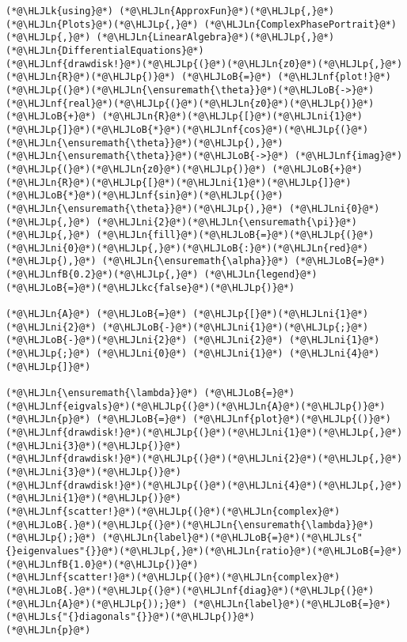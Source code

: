 \documentclass[12pt,a4paper]{article}
\newcommand{\HLJLk}[1]{\textcolor[RGB]{148,91,176}{\textbf{#1}}}
\newcommand{\HLJLkc}[1]{\textcolor[RGB]{59,151,46}{\textit{#1}}}
\newcommand{\HLJLn}[1]{#1}
\newcommand{\HLJLnf}[1]{\textcolor[RGB]{66,102,213}{#1}}
\newcommand{\HLJLs}[1]{\textcolor[RGB]{201,61,57}{#1}}
\newcommand{\HLJLnfB}[1]{\textcolor[RGB]{59,151,46}{#1}}
\newcommand{\HLJLni}[1]{\textcolor[RGB]{59,151,46}{#1}}
\newcommand{\HLJLoB}[1]{\textcolor[RGB]{102,102,102}{\textbf{#1}}}
\newcommand{\HLJLp}[1]{#1}
\begin{document}
\begin{lstlisting}
(*@\HLJLk{using}@*) (*@\HLJLn{ApproxFun}@*)(*@\HLJLp{,}@*) (*@\HLJLn{Plots}@*)(*@\HLJLp{,}@*) (*@\HLJLn{ComplexPhasePortrait}@*)(*@\HLJLp{,}@*) (*@\HLJLn{LinearAlgebra}@*)(*@\HLJLp{,}@*) (*@\HLJLn{DifferentialEquations}@*)
(*@\HLJLnf{drawdisk!}@*)(*@\HLJLp{(}@*)(*@\HLJLn{z0}@*)(*@\HLJLp{,}@*) (*@\HLJLn{R}@*)(*@\HLJLp{)}@*) (*@\HLJLoB{=}@*) (*@\HLJLnf{plot!}@*)(*@\HLJLp{(}@*)(*@\HLJLn{\ensuremath{\theta}}@*)(*@\HLJLoB{->}@*) (*@\HLJLnf{real}@*)(*@\HLJLp{(}@*)(*@\HLJLn{z0}@*)(*@\HLJLp{)}@*) (*@\HLJLoB{+}@*) (*@\HLJLn{R}@*)(*@\HLJLp{[}@*)(*@\HLJLni{1}@*)(*@\HLJLp{]}@*)(*@\HLJLoB{*}@*)(*@\HLJLnf{cos}@*)(*@\HLJLp{(}@*)(*@\HLJLn{\ensuremath{\theta}}@*)(*@\HLJLp{),}@*) (*@\HLJLn{\ensuremath{\theta}}@*)(*@\HLJLoB{->}@*) (*@\HLJLnf{imag}@*)(*@\HLJLp{(}@*)(*@\HLJLn{z0}@*)(*@\HLJLp{)}@*) (*@\HLJLoB{+}@*) (*@\HLJLn{R}@*)(*@\HLJLp{[}@*)(*@\HLJLni{1}@*)(*@\HLJLp{]}@*)(*@\HLJLoB{*}@*)(*@\HLJLnf{sin}@*)(*@\HLJLp{(}@*)(*@\HLJLn{\ensuremath{\theta}}@*)(*@\HLJLp{),}@*) (*@\HLJLni{0}@*)(*@\HLJLp{,}@*) (*@\HLJLni{2}@*)(*@\HLJLn{\ensuremath{\pi}}@*)(*@\HLJLp{,}@*) (*@\HLJLn{fill}@*)(*@\HLJLoB{=}@*)(*@\HLJLp{(}@*)(*@\HLJLni{0}@*)(*@\HLJLp{,}@*)(*@\HLJLoB{:}@*)(*@\HLJLn{red}@*)(*@\HLJLp{),}@*) (*@\HLJLn{\ensuremath{\alpha}}@*) (*@\HLJLoB{=}@*) (*@\HLJLnfB{0.2}@*)(*@\HLJLp{,}@*) (*@\HLJLn{legend}@*)(*@\HLJLoB{=}@*)(*@\HLJLkc{false}@*)(*@\HLJLp{)}@*)

(*@\HLJLn{A}@*) (*@\HLJLoB{=}@*) (*@\HLJLp{[}@*)(*@\HLJLni{1}@*) (*@\HLJLni{2}@*) (*@\HLJLoB{-}@*)(*@\HLJLni{1}@*)(*@\HLJLp{;}@*) (*@\HLJLoB{-}@*)(*@\HLJLni{2}@*) (*@\HLJLni{2}@*) (*@\HLJLni{1}@*)(*@\HLJLp{;}@*) (*@\HLJLni{0}@*) (*@\HLJLni{1}@*) (*@\HLJLni{4}@*)(*@\HLJLp{]}@*)

(*@\HLJLn{\ensuremath{\lambda}}@*) (*@\HLJLoB{=}@*) (*@\HLJLnf{eigvals}@*)(*@\HLJLp{(}@*)(*@\HLJLn{A}@*)(*@\HLJLp{)}@*)
(*@\HLJLn{p}@*) (*@\HLJLoB{=}@*) (*@\HLJLnf{plot}@*)(*@\HLJLp{()}@*)
(*@\HLJLnf{drawdisk!}@*)(*@\HLJLp{(}@*)(*@\HLJLni{1}@*)(*@\HLJLp{,}@*)(*@\HLJLni{3}@*)(*@\HLJLp{)}@*)
(*@\HLJLnf{drawdisk!}@*)(*@\HLJLp{(}@*)(*@\HLJLni{2}@*)(*@\HLJLp{,}@*)(*@\HLJLni{3}@*)(*@\HLJLp{)}@*)
(*@\HLJLnf{drawdisk!}@*)(*@\HLJLp{(}@*)(*@\HLJLni{4}@*)(*@\HLJLp{,}@*)(*@\HLJLni{1}@*)(*@\HLJLp{)}@*)
(*@\HLJLnf{scatter!}@*)(*@\HLJLp{(}@*)(*@\HLJLn{complex}@*)(*@\HLJLoB{.}@*)(*@\HLJLp{(}@*)(*@\HLJLn{\ensuremath{\lambda}}@*)(*@\HLJLp{);}@*) (*@\HLJLn{label}@*)(*@\HLJLoB{=}@*)(*@\HLJLs{"{}eigenvalues"{}}@*)(*@\HLJLp{,}@*)(*@\HLJLn{ratio}@*)(*@\HLJLoB{=}@*)(*@\HLJLnfB{1.0}@*)(*@\HLJLp{)}@*)
(*@\HLJLnf{scatter!}@*)(*@\HLJLp{(}@*)(*@\HLJLn{complex}@*)(*@\HLJLoB{.}@*)(*@\HLJLp{(}@*)(*@\HLJLnf{diag}@*)(*@\HLJLp{(}@*)(*@\HLJLn{A}@*)(*@\HLJLp{));}@*) (*@\HLJLn{label}@*)(*@\HLJLoB{=}@*)(*@\HLJLs{"{}diagonals"{}}@*)(*@\HLJLp{)}@*)
(*@\HLJLn{p}@*)
\end{lstlisting}
\end{document}
